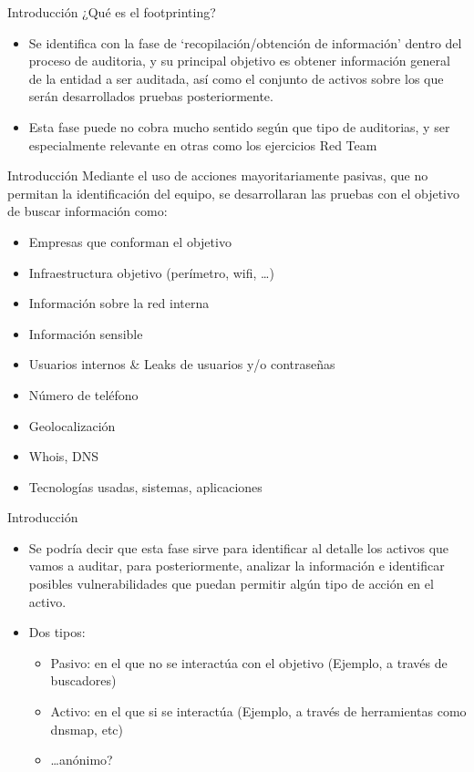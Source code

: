 \documentclass[aspectratio=169,11pt]{beamer}
\begin{document}
\begin{frame}[allowframebreaks]{Introducción}
\small
¿Qué es el footprinting?
  \begin{itemize}
  \item Se identifica con la fase de `recopilación/obtención de información' dentro del proceso de auditoria, y su principal objetivo es obtener información general de la entidad a ser auditada, así como el conjunto de activos sobre los que serán desarrollados pruebas posteriormente.
  \item Esta fase puede no cobra mucho sentido según que tipo de auditorias, y ser especialmente relevante en otras como los ejercicios Red Team
  \end{itemize}
\end{frame}

\begin{frame}[allowframebreaks]{Introducción}
\small
Mediante el uso de acciones mayoritariamente pasivas, que no permitan la identificación del equipo, se desarrollaran las pruebas con el objetivo de buscar información como:

\begin{itemize}
  \item Empresas que conforman el objetivo
  \item Infraestructura objetivo (perímetro, wifi, \dots{})
  \item Información sobre la red interna
  \item Información sensible
  \item Usuarios internos \& Leaks de usuarios y/o contraseñas
  \item Número de teléfono
  \item Geolocalización
  \item Whois, DNS
  \item Tecnologías usadas, sistemas, aplicaciones
  \end{itemize}
\end{frame}

\begin{frame}[allowframebreaks]{Introducción}
\small
  \begin{itemize}
  \item Se podría decir que esta fase sirve para identificar al detalle los activos que vamos a auditar, para posteriormente, analizar la información e identificar posibles vulnerabilidades que puedan permitir algún tipo de acción en el activo.
  \item Dos tipos:
    \begin{itemize}

  \item Pasivo: en el que no se interactúa con el objetivo (Ejemplo, a través de buscadores)
  \item Activo: en el que si se interactúa (Ejemplo, a través de herramientas como dnsmap, etc)
  \item \dots{}anónimo?
    \end{itemize}

  \end{itemize}
\end{frame}
\end{document}

